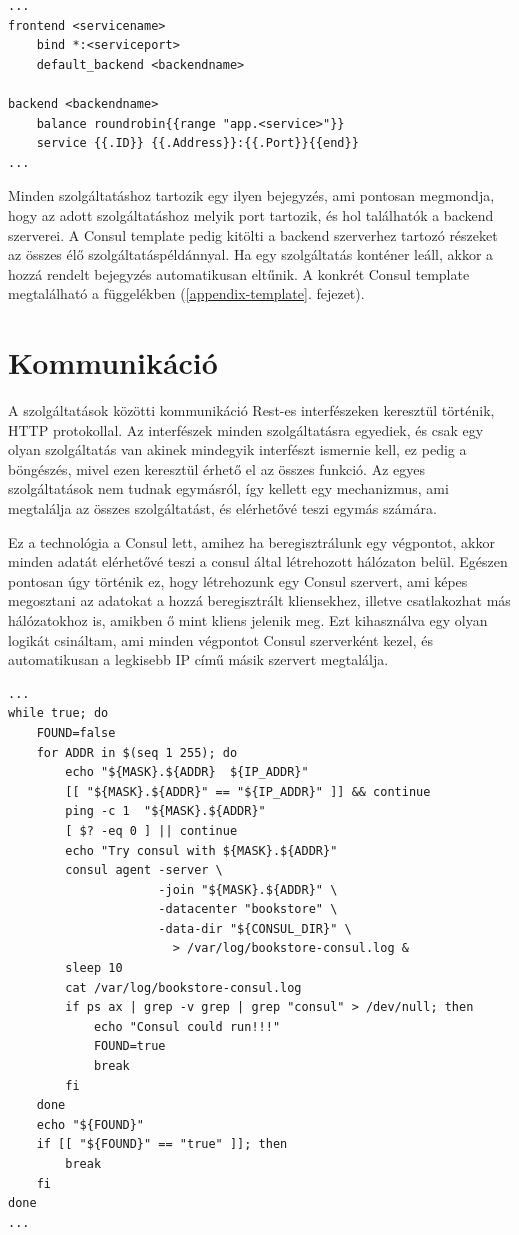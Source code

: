 \documentclass[11pt,magyar,a4paper,twoside,]{report}
\begin{document}
\begin{verbatim}
...
frontend <servicename>
    bind *:<serviceport>
    default_backend <backendname>

backend <backendname>
    balance roundrobin{{range "app.<service>"}}
    service {{.ID}} {{.Address}}:{{.Port}}{{end}}
...
\end{verbatim}

Minden szolgáltatáshoz tartozik egy ilyen bejegyzés, ami pontosan
megmondja, hogy az adott szolgáltatáshoz melyik port tartozik, és hol
találhatók a backend szerverei. A Consul template pedig kitölti a
backend szerverhez tartozó részeket az összes élő
szolgáltatáspéldánnyal. Ha egy szolgáltatás konténer leáll, akkor a
hozzá rendelt bejegyzés automatikusan eltűnik. A konkrét Consul template
megtalálható a függelékben (\ref{appendix-template}. fejezet).

\section{Kommunikáció}\label{kommunikuxe1ciuxf3-1}

A szolgáltatások közötti kommunikáció Rest-es interfészeken keresztül
történik, HTTP protokollal. Az interfészek minden szolgáltatásra
egyediek, és csak egy olyan szolgáltatás van akinek mindegyik interfészt
ismernie kell, ez pedig a böngészés, mivel ezen keresztül érhető el az
összes funkció. Az egyes szolgáltatások nem tudnak egymásról, így
kellett egy mechanizmus, ami megtalálja az összes szolgáltatást, és
elérhetővé teszi egymás számára.

Ez a technológia a Consul lett, amihez ha beregisztrálunk egy végpontot,
akkor minden adatát elérhetővé teszi a consul által létrehozott
hálózaton belül. Egészen pontosan úgy történik ez, hogy létrehozunk egy
Consul szervert, ami képes megosztani az adatokat a hozzá beregisztrált
kliensekhez, illetve csatlakozhat más hálózatokhoz is, amikben ő mint
kliens jelenik meg. Ezt kihasználva egy olyan logikát csináltam, ami
minden végpontot Consul szerverként kezel, és automatikusan a legkisebb
IP című másik szervert megtalálja.

\begin{verbatim}
...
while true; do
    FOUND=false
    for ADDR in $(seq 1 255); do
        echo "${MASK}.${ADDR}  ${IP_ADDR}"
        [[ "${MASK}.${ADDR}" == "${IP_ADDR}" ]] && continue
        ping -c 1  "${MASK}.${ADDR}"
        [ $? -eq 0 ] || continue
        echo "Try consul with ${MASK}.${ADDR}"
        consul agent -server \
                     -join "${MASK}.${ADDR}" \
                     -datacenter "bookstore" \
                     -data-dir "${CONSUL_DIR}" \
                       > /var/log/bookstore-consul.log &
        sleep 10
        cat /var/log/bookstore-consul.log
        if ps ax | grep -v grep | grep "consul" > /dev/null; then
            echo "Consul could run!!!"
            FOUND=true
            break
        fi
    done
    echo "${FOUND}"
    if [[ "${FOUND}" == "true" ]]; then
        break
    fi
done
...
\end{verbatim}
\end{document}
